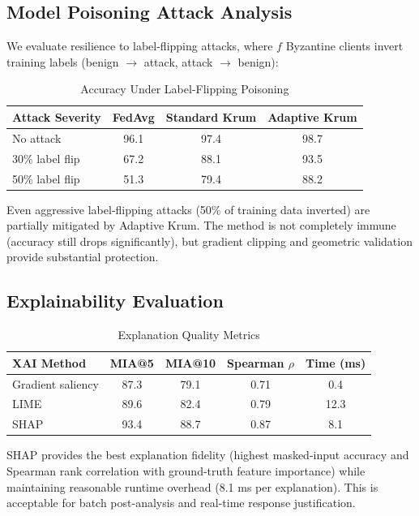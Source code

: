 \documentclass[preprint,12pt]{elsarticle}
\begin{document}
\subsection{Model Poisoning Attack Analysis}

We evaluate resilience to label-flipping attacks, where $f$ Byzantine clients invert training labels (benign $\to$ attack, attack $\to$ benign):

\begin{table}[!t]
\caption{Accuracy Under Label-Flipping Poisoning}
\label{tab:poisoning}
\centering
\small
\begin{tabular}{@{}lccc@{}}
\toprule
\textbf{Attack Severity} & \textbf{FedAvg} & \textbf{Standard Krum} & \textbf{Adaptive Krum} \\
\midrule
No attack & 96.1 & 97.4 & 98.7 \\
30\% label flip & 67.2 & 88.1 & 93.5 \\
50\% label flip & 51.3 & 79.4 & 88.2 \\
\bottomrule
\end{tabular}
\end{table}

Even aggressive label-flipping attacks (50\% of training data inverted) are partially mitigated by Adaptive Krum. The method is not completely immune (accuracy still drops significantly), but gradient clipping and geometric validation provide substantial protection.

\subsection{Explainability Evaluation}

\begin{table}[!t]
\caption{Explanation Quality Metrics}
\label{tab:xai}
\centering
\small
\begin{tabular}{@{}lcccc@{}}
\toprule
\textbf{XAI Method} & \textbf{MIA@5} & \textbf{MIA@10} & \textbf{Spearman $\rho$} & \textbf{Time (ms)} \\
\midrule
Gradient saliency & 87.3 & 79.1 & 0.71 & 0.4 \\
LIME & 89.6 & 82.4 & 0.79 & 12.3 \\
SHAP & 93.4 & 88.7 & 0.87 & 8.1 \\
\bottomrule
\end{tabular}
\end{table}

SHAP provides the best explanation fidelity (highest masked-input accuracy and Spearman rank correlation with ground-truth feature importance) while maintaining reasonable runtime overhead (8.1 ms per explanation). This is acceptable for batch post-analysis and real-time response justification.
\end{document}
